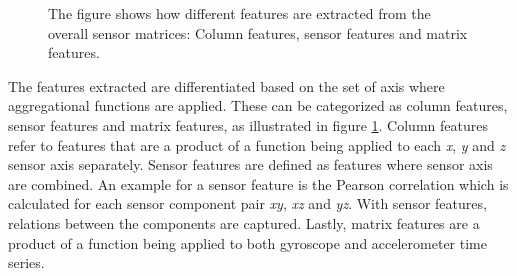 \begin{figure}[h!]
\begin{minipage}{.3\textwidth}
  \end{minipage}
  \begin{minipage}{.3\textwidth}
    \centering
  \end{minipage}
  \caption{The figure shows how different features are extracted from the overall sensor matrices: Column features, sensor features and matrix features.}\label{fig:featureextraction}
\end{figure}  

The features extracted are differentiated based on the set of axis where aggregational functions are applied. These can be categorized as column features, sensor features and matrix features, as illustrated in figure \ref{fig:featureextraction}. Column features refer to features that are a product of a function being applied to each \textit{x}, \textit{y} and \textit{z} sensor axis separately. Sensor features are defined as features where sensor axis are combined. An example for a sensor feature is the Pearson correlation which is calculated for each sensor component pair \textit{xy}, \textit{xz} and \textit{yz}. With sensor features, relations between the components are captured. Lastly, matrix features are a product of a function being applied to both gyroscope and accelerometer time series.

